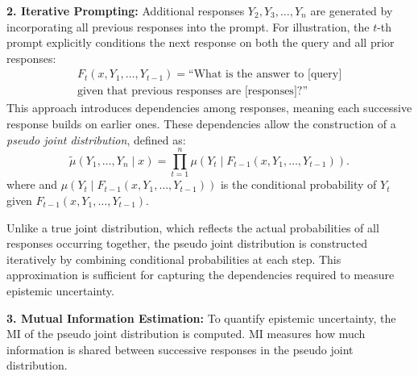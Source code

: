     \noindent\textbf{2. Iterative Prompting:} Additional responses \(Y_2, Y_3, \ldots, Y_n\) are generated by incorporating all previous responses into the prompt. For illustration, the \(t\)-th prompt explicitly conditions the next response on both the query and all prior responses:
    \begin{multline}
        F_t(x, Y_1, \ldots, Y_{t-1}) = \text{``What is the answer to [query]} \\
        \text{given that previous responses are [responses]?''}
        \label{eq:iterative_prompt}
    \end{multline}
    This approach introduces dependencies among responses, meaning each successive response builds on earlier ones. 
    These dependencies allow the construction of a \emph{pseudo joint distribution}, defined as:
    \[
    \tilde{\mu}(Y_1, \ldots, Y_n \mid x) = \prod_{t=1}^n \mu(Y_t \mid F_{t-1}(x, Y_1, \ldots, Y_{t-1})).
    \]
    where and $\mu(Y_t \mid F_{t-1}(x, Y_1, \ldots, Y_{t-1}))$ is the conditional probability of $Y_t$ given $F_{t-1}(x, Y_1, \ldots, Y_{t-1})$.
    
    Unlike a true joint distribution, which reflects the actual probabilities of all responses occurring together, the pseudo joint distribution is constructed iteratively by combining conditional probabilities at each step. 
    This approximation is sufficient for capturing the dependencies required to measure epistemic uncertainty.

    \noindent\textbf{3. Mutual Information Estimation:} To quantify epistemic uncertainty, the MI of the pseudo joint distribution is computed. MI measures how much information is shared between successive responses in the pseudo joint distribution.


